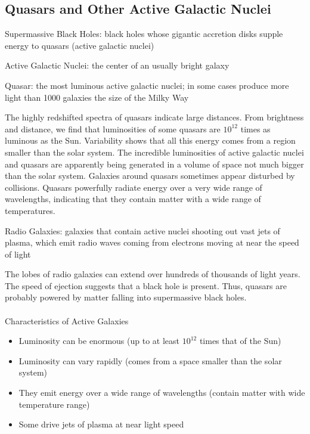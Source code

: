 \documentclass[12pt]{article}
\begin{document}
\subsection{Quasars and Other Active Galactic Nuclei} 
\begin{definition} Supermassive Black Holes: black holes whose gigantic accretion disks supple energy to quasars (active galactic nuclei) \end{definition}
\begin{definition} Active Galactic Nuclei: the center of an usually bright galaxy \end{definition} 
\begin{definition} Quasar: the most luminous active galactic nuclei; in some cases produce more light than 1000 galaxies the size of the Milky Way \end{definition} 
The highly redshifted spectra of quasars indicate large distances. From brightness and distance, we find that luminosities of some quasars are $10^{12}$ times as luminous as the Sun. Variability shows that all this energy comes from a region smaller than the solar system. The incredible luminosities of active galactic nuclei and quasars are apparently being generated in a volume of space not much bigger than the solar system. Galaxies around quasars sometimes appear disturbed by collisions. Quasars powerfully radiate energy over a very wide range of wavelengths, indicating that they contain matter with a wide range of temperatures. 
\begin{definition} Radio Galaxies: galaxies that contain active nuclei shooting out vast jets of plasma, which emit radio waves coming from electrons moving at near the speed of light \end{definition} 
The lobes of radio galaxies can extend over hundreds of thousands of light years. The speed of ejection suggests that a black hole is present. Thus, quasars are probably powered by matter falling into supermassive black holes. \\~\\
Characteristics of Active Galaxies \begin{itemize} 
\item Luminosity can be enormous (up to at least $10^{12}$ times that of the Sun)
\item Luminosity can vary rapidly (comes from a space smaller than the solar system)
\item They emit energy over a wide range of wavelengths (contain matter with wide temperature range)
\item Some drive jets of plasma at near light speed \end{itemize} 
\end{document}
